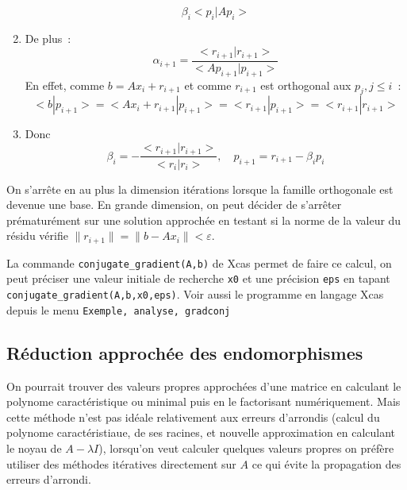 \documentclass[a4paper,11pt]{article}
\begin{document}
\begin{giacjshere}
\begin{enumerate}
$$\beta_i<p_i|Ap_i>$$
\item De plus~:
$$\alpha_{i+1}=\frac{<r_{i+1}|r_{i+1}>}{<Ap_{i+1}|p_{i+1}>}$$
En effet, comme
$b=Ax_i+r_{i+1}$ et comme $r_{i+1}$ est orthogonal aux $p_j, j \leq i$~:
$$ <b|p_{i+1}>=<Ax_i+r_{i+1}|p_{i+1}>=<r_{i+1}|p_{i+1}>=<r_{i+1}|r_{i+1}>$$
\item Donc 
$$ \beta_i=-\frac{<r_{i+1}|r_{i+1}>}{<r_{i}|r_{i}>},
\quad p_{i+1}=r_{i+1}-\beta_i p_i$$
\end{enumerate}
On s'arr\^ete en au plus la dimension itérations 
lorsque la famille orthogonale est devenue une base. En grande
dimension, on peut d\'ecider de s'arr\^eter pr\'ematur\'ement
sur une solution approch\'ee en testant
si la norme de la valeur du r\'esidu v\'erifie
$\|r_{i+1}\|=\|b-Ax_i\|<\varepsilon$.

La commande \verb|conjugate_gradient(A,b)| de Xcas permet de faire ce
calcul, on peut préciser une valeur initiale de recherche \verb|x0|
et une précision \verb|eps| en tapant 
\verb|conjugate_gradient(A,b,x0,eps)|.
Voir aussi le programme en langage Xcas depuis le 
menu {\tt Exemple, analyse, gradconj}
 
\subsection{Réduction approchée des endomorphismes}
On pourrait trouver des valeurs propres approchées d'une matrice
en calculant le polynome caractéristique ou minimal puis en le
factorisant numériquement. Mais cette méthode n'est pas idéale
relativement aux erreurs d'arrondis (calcul du polynome caractéristiaue,
de ses racines, et nouvelle approximation en calculant le noyau
de $A-\lambda I$), lorsqu'on veut calculer quelques valeurs propres
on préfère utiliser des méthodes itératives directement sur $A$
ce qui évite la propagation des erreurs d'arrondi.


\end{giacjshere}
\end{document}
